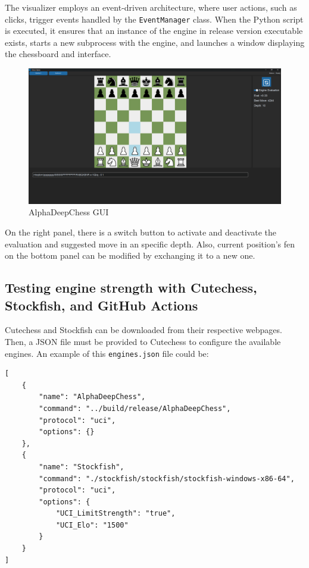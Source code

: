 \vspace{1em}

\noindent The visualizer employs an event-driven architecture, where user actions, such as clicks, trigger events handled by the \texttt{EventManager} class. When the Python script is executed, it ensures that an instance of the engine in release version executable exists, starts a new subprocess with the engine, and launches a window displaying the chessboard and interface.

\begin{figure}[H]
    \centering
    \includegraphics[width=\textwidth]{Imagenes/gui.png}
    \caption{AlphaDeepChess GUI}
    \label{fig:gui}
\end{figure}

On the right panel, there is a switch button to activate and deactivate the evaluation and suggested move in an specific depth. Also, current position's fen on the bottom panel can be modified by exchanging it to a new one.

\subsection{Testing engine strength with Cutechess, Stockfish, and GitHub Actions}

Cutechess and Stockfish can be downloaded from their respective webpages. Then, a JSON file must be provided to Cutechess to configure the available engines. An example of this \texttt{engines.json} file could be:

\vspace{1em}

\begin{lstlisting}[breaklines=true, frame=single]
[
    {
        "name": "AlphaDeepChess",
        "command": "../build/release/AlphaDeepChess",
        "protocol": "uci",
        "options": {}
    },
    {
        "name": "Stockfish",
        "command": "./stockfish/stockfish/stockfish-windows-x86-64",
        "protocol": "uci",
        "options": {
            "UCI_LimitStrength": "true",
            "UCI_Elo": "1500"
        }
    }
]
\end{lstlisting}

